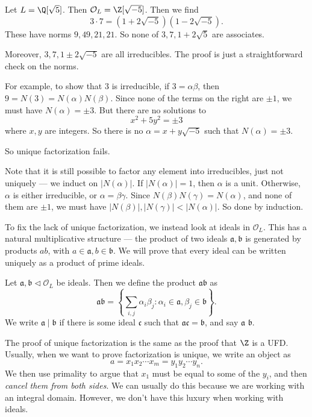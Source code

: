 \documentclass[a4paper]{article}
\begin{document}
\begin{eg}
  Let $L = \Q[\sqrt{5}]$. Then $\mathcal{O}_L = \Z[\sqrt{-5}]$. Then we find
  \[
    3 \cdot 7 = (1 + 2\sqrt{-5})(1 - 2\sqrt{-5}).
  \]
  These have norms $9, 49, 21, 21$. So none of $3, 7, 1 + 2\sqrt{5}$ are associates.

  Moreover, $3, 7, 1 \pm 2\sqrt{-5}$ are all irreducibles. The proof is just a straightforward check on the norms.

  For example, to show that $3$ is irreducible, if $3 = \alpha \beta$, then $9 = N(3) = N(\alpha) N(\beta)$. Since none of the terms on the right are $\pm 1$, we must have $N(\alpha) = \pm 3$. But there are no solutions to
  \[
    x^2 + 5y^2 = \pm 3
  \]
  where $x, y$ are integers. So there is no $\alpha = x + y\sqrt{-5}$ such that $N(\alpha) = \pm 3$.

  So unique factorization fails.
\end{eg}

Note that it is still possible to factor any element into irreducibles, just not uniquely --- we induct on $|N(\alpha)|$. If $|N(\alpha)| = 1$, then $\alpha$ is a unit. Otherwise, $\alpha$ is either irreducible, or $\alpha = \beta \gamma$. Since $N(\beta)N(\gamma) = N(\alpha)$, and none of them are $\pm 1$, we must have $|N(\beta)|, |N(\gamma)| < |N(\alpha)|$. So done by induction.

To fix the lack of unique factorization, we instead look at ideals in $\mathcal{O}_L$. This has a natural multiplicative structure --- the product of two ideals $\mathfrak{a}, \mathfrak{b}$ is generated by products $ab$, with $a \in \mathfrak{a}, b \in \mathfrak{b}$. We will prove that every ideal can be written uniquely as a product of prime ideals.
\begin{defi}
  Let $\mathfrak{a}, \mathfrak{b}\lhd \mathcal{O}_L$ be ideals. Then we define the product $\mathfrak{a}\mathfrak{b}$ as
  \[
    \mathfrak{a} \mathfrak{b} = \left\{\sum_{i, j} \alpha_i \beta_j: \alpha_i \in \mathfrak{a}, \beta_j \in \mathfrak{b}\right\}.
  \]
  We write $\mathfrak{a} \mid \mathfrak{b}$ if there is some ideal $\mathfrak{c}$ such that $\mathfrak{a}\mathfrak{c} = \mathfrak{b}$, and say $\mathfrak{a}$  $\mathfrak{b}$.
\end{defi}
The proof of unique factorization is the same as the proof that $\Z$ is a UFD. Usually, when we want to prove factorization is unique, we write an object as
\[
  a = x_1 x_2 \cdots x_m = y_1 y_2 \cdots y_n.
\]
We then use primality to argue that $x_1$ must be equal to some of the $y_i$, and then \emph{cancel them from both sides}. We can usually do this because we are working with an integral domain. However, we don't have this luxury when working with ideals.
\end{document}

